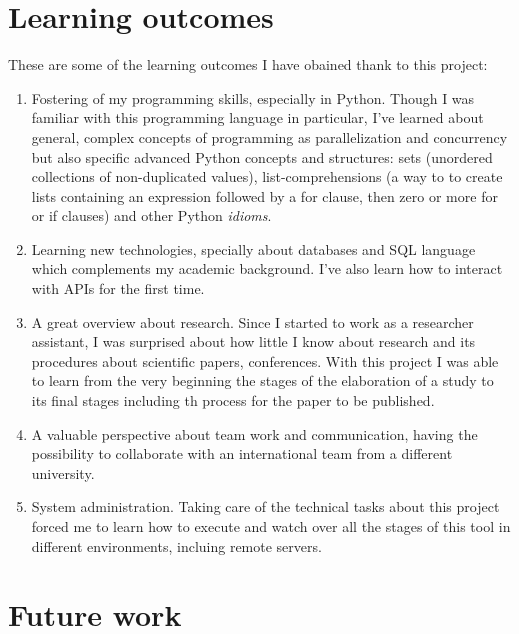\documentclass[a4paper, 12pt]{book}
\begin{document}
\section{Learning outcomes}
\label{sec:learning-outcomes}
These are some of the learning outcomes I have obained thank to this project:
\begin{enumerate}
  \item Fostering of my programming skills, especially in Python. Though I was familiar with
  this programming language in particular, I've learned about general, complex concepts of programming
  as parallelization and concurrency but also specific advanced Python concepts and structures:
  sets (unordered collections of non-duplicated values), list-comprehensions
  (a way to to create lists containing an expression followed by a for clause, then
  zero or more for or if clauses) and other Python \textit{idioms}.
  \item Learning new technologies, specially about databases and SQL language which
  complements my academic background. I've also learn how to interact with APIs for the first time.
  \item A great overview about research. Since I started to work as a researcher assistant,
  I was surprised about how little I know about research and its procedures about scientific papers,
  conferences. With this project I was able to learn from the very beginning the stages of the elaboration
  of a study to its final stages including th process for the paper to be published.
  \item A valuable perspective about team work and communication, having the possibility
  to collaborate with an international team from a different university.
  \item System administration. Taking care of the technical tasks about this project forced me
  to learn how to execute and watch over all the stages of this tool in different environments,
  incluing remote servers.
\end{enumerate}
\section{Future work}
\label{sec:future-work}
\end{document}
